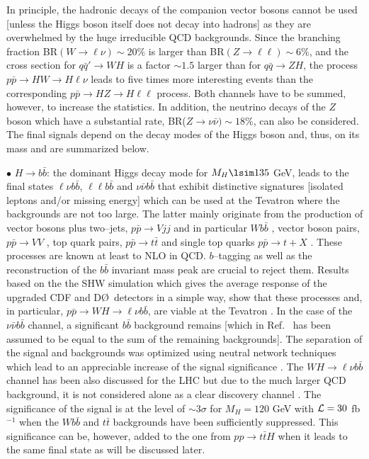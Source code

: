 In principle, the hadronic decays of the companion vector bosons cannot be used
[unless the Higgs boson itself does not decay into hadrons] as they are
overwhelmed by the huge irreducible QCD backgrounds. Since the branching
fraction BR$(W \to \ell \nu) \sim 20\%$ is larger than BR$(Z \to \ell \ell)
\sim 6\%$, and the cross section for $q \bar q' \to WH$ is a factor $\sim 1.5$
larger than for $q \bar q \to ZH$, the process $p\bar p\to HW \to H\ell \nu$
leads to five times more interesting events than the corresponding $p\bar p \to
HZ \to H\ell \ell $ process. Both channels have to be summed, however, to
increase the statistics.  In addition, the neutrino decays of the $Z$ boson
which have a substantial rate, BR($Z \to \nu \bar{\nu}) \sim 18\%$, can also be
considered.  The final signals depend on the decay modes of the Higgs boson
and, thus, on its mass and are summarized below.  \s

$\bullet$ \underline{$H \to b\bar{b}$}: the dominant Higgs decay mode for
$M_H \lsim 135$ GeV, leads to the final states $\ell \nu  b\bar{b}$, $\ell \ell
b\bar{b}$ and $\nu \bar{\nu} b\bar{b}$ that exhibit distinctive signatures
[isolated leptons and/or missing energy] which can be used at the Tevatron
where the backgrounds are not too large. The latter mainly originate from the
production of vector bosons plus two--jets, $p\bar p \to Vjj$ and in particular
$Wb\bar b$ \cite{pp-bkg-Vjj,pp-bkg-vecbos}, vector boson pairs, $p\bar p \to
VV$ \cite{pp-bkg-vecbos,pp-bkg-WW,pp-bkg-ZZ}, top quark pairs, $p\bar p\to
t\bar t$ \cite{pp-bkg-tt} and single top quarks $p\bar p \to t+X$
\cite{ppSingleTop}.  These  processes are known at least to NLO in QCD. 
$b$--tagging as well as the reconstruction of the $b\bar b$ invariant mass peak
are crucial to reject them.  Results based on the the SHW simulation
\cite{SHW-Tevatron} which gives the average response of the upgraded CDF and
D\O\ detectors in a simple way, show that these processes and, in particular, 
$p\bar p \to WH \to \ell \nu b\bar b$, are viable at the Tevatron
\cite{Higgs-TeV}. In the case of the $\nu \bar \nu b\bar b$ channel, a
significant $b\bar b$ background remains [which in Ref.~ \cite{Higgs-TeV} has
been assumed to be equal to the sum of the remaining backgrounds]. The
separation of the signal and backgrounds was optimized using neutral network
techniques which lead to an appreciable increase of the signal significance
\cite{NN-Tevatron,NN-Tevatron-U}. The $WH \to \ell \nu b \bar b$ channel has
been also discussed for the LHC \cite{pp-Galison,pp-HW-bb-LHC} but due to the
much larger QCD background, it is not considered alone as a clear discovery
channel
\cite{ATLAS-TDR,CMS-review,pp-HW+Htt-Froidevaux,pp-HW-bb-E,pp-HWHbb+Httbb-sim}.
The significance of the signal is at the level of $\sim 3\sigma$ for $M_H=120$
GeV with ${\cal L}=30$ fb$^{-1}$ \cite{pp-HW-bb-E} when the $Wb\bar b$ and
$t\bar t$  backgrounds have been sufficiently suppressed. This significance can
be, however, added to the one from $pp \to t\bar t H$ when it leads
to the same final state as will be discussed later.\s
 

